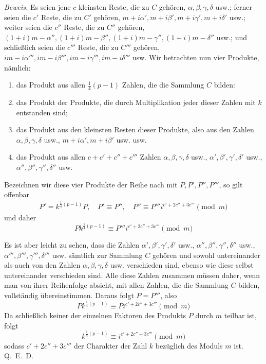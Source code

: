 \emph{Beweis.} Es seien jene $c$ kleinsten Reste, die zu $C$ gehören, $\alpha,\beta,\gamma,\delta$ usw.; ferner seien die $c'$ Reste, die zu $C'$ gehören, $m+i\alpha',m+i\beta',m+i\gamma',m+i\delta'$ usw.; weiter seien die $c''$ Reste, die zu $C''$ gehören, $(1+i)m-\alpha'',(1+i)m-\beta'',(1+i)m-\gamma'',(1+i)m-\delta''$ usw.; und schließlich seien die $c'''$ Reste, die zu $C'''$ gehören, $im-i\alpha''',im-i\beta''',im-i\gamma''',im-i\delta'''$ usw. Wir betrachten nun vier Produkte, nämlich:
\begin{enumerate}
\renewcommand{\labelenumi}{\arabic{enumi})}
\item das Produkt aus allen $\frac14(p-1)$ Zahlen, die die Sammlung $C$ bilden:
\item das Produkt der Produkte, die durch Multiplikation jeder dieser Zahlen mit $k$ entstanden sind;
\item das Produkt aus den kleinsten Resten dieser Produkte, also aus den Zahlen $\alpha,\beta,\gamma,\delta$ usw., $m+i\alpha',m+i\beta'$ usw. usw.
\item das Produkt aus allen $c+c'+c''+c'''$ Zahlen $\alpha,\beta,\gamma,\delta$ usw., $\alpha',\beta',\gamma',\delta'$ usw., $\alpha'',\beta'',\gamma'',\delta''$ usw.
\end{enumerate}
Bezeichnen wir diese vier Produkte der Reihe nach mit $P,P',P'',P'''$, so gilt offenbar
\[
\begin{gathered}
P'=k^{\frac14(p-1)}P,\quad P'\equiv P'',\quad
P''\equiv P'''i^{c'+2c''+3c'''}\pmod m
\end{gathered}
\]
und daher
\[
Pk^{\frac14(p-1)}\equiv P'''i^{c'+2c''+3c'''}\pmod m
\]

Es ist aber leicht zu sehen, dass die Zahlen $\alpha',\allowbreak\beta',\allowbreak\gamma',\allowbreak\delta'$ usw., $\alpha'',\allowbreak\beta'',\allowbreak\gamma'',\allowbreak\delta''$ usw., $\alpha''',\allowbreak\beta''',\allowbreak\gamma''',\allowbreak\delta'''$ usw. sämtlich zur Sammlung $C$ gehören und sowohl untereinander als auch von den Zahlen $\alpha,\allowbreak\beta,\allowbreak\gamma,\allowbreak\delta$ usw. verschieden sind, ebenso wie diese selbst untereinander verschieden sind. Alle diese Zahlen zusammen müssen daher, wenn man von ihrer Reihenfolge absieht, mit allen Zahlen, die die Sammlung $C$ bilden, vollständig übereinstimmen. Daraus folgt $P=P'''$, also
\[
Pk^{\frac14(p-1)}\equiv Pi^{c'+2c''+3c'''}\pmod m
\]
Da schließlich keiner der einzelnen Faktoren des Produkts $P$ durch $m$ teilbar ist, folgt
\[
k^{\frac14(p-1)}\equiv i^{c'+2c''+3c'''}\pmod m
\]
sodass $c'+2c''+3c'''$ der Charakter der Zahl $k$ bezüglich des Moduls $m$ ist. Q.~E.~D.

